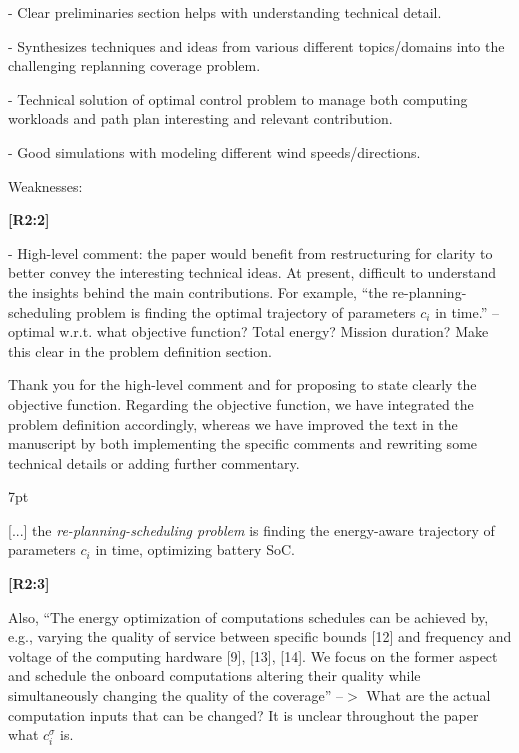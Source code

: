 \documentclass[10pt]{letter}
\newenvironment{formal}{%
  \def\FrameCommand{%
    \hspace{1pt}%
    {\color{red}\vrule width 2pt}%
    {\color{formalshade}\vrule width 4pt}%
    \colorbox{formalshade}%
  }%
  \MakeFramed{\advance\hsize-\width\FrameRestore}%
  \noindent\hspace{-4.55pt}%
  \begin{adjustwidth}{}{7pt}%
  \vspace{2pt}\vspace{2pt}%
}
{%
  \vspace{2pt}\end{adjustwidth}\endMakeFramed%
}
\begin{document}
- Clear preliminaries section helps with understanding technical detail.

- Synthesizes techniques and ideas from various different topics/domains into the challenging replanning coverage problem.

- Technical solution of optimal control problem to manage both computing workloads and path plan interesting and relevant contribution.
  
- Good simulations with modeling different wind speeds/directions.

\vspace{2em}

Weaknesses:

  
{\hspace*{-4.5em}\textbf{[R2:2]}\vspace*{-1.9em}}
  
- High-level comment: the paper would benefit from restructuring for clarity to better convey the interesting technical ideas. At present, difficult to understand the insights behind the main contributions. For example, ``the re-planning-scheduling problem is finding the optimal trajectory of parameters $c_i$ in time.'' -- optimal w.r.t. what objective function? Total energy? Mission duration? Make this clear in the problem definition section. 
  
{\color{blue} 

{\hspace*{-4.5em}{[R2:2]}\vspace*{-1.9em}}

Thank you for the high-level comment and for proposing to state clearly the objective function. Regarding the objective function, we have integrated the problem definition accordingly, whereas we have improved the text in the manuscript by both implementing the specific comments and rewriting some technical details or adding further commentary. 

\begin{formal}
  {\color{black} [...] the \emph{re-planning-scheduling problem} is finding the {\color{blue}energy-aware} trajectory of parameters $c_i$ in time{\color{blue}, optimizing battery SoC}.}
  \vspace*{1ex}
\end{formal}
}
  
  {\hspace*{-4.5em}\textbf{[R2:3]}\vspace*{-1.9em}}

  Also, ``The energy optimization of computations schedules can be achieved by, e.g., varying the quality of service between specific bounds [12] and frequency and voltage of the computing hardware [9], [13], [14]. We focus on the former aspect and schedule the onboard computations altering their quality while simultaneously changing the quality of the coverage'' --$>$ What are the actual computation inputs that can be changed? It is unclear throughout the paper what $c_i^\sigma$ is. 
  
\end{document}
